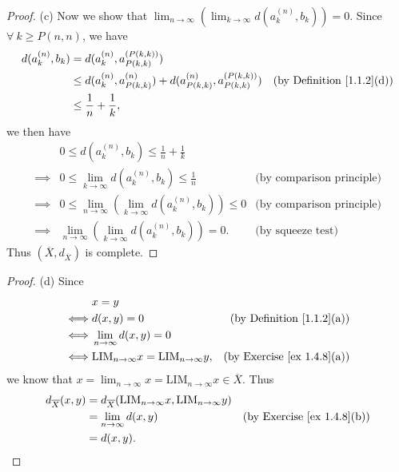 \begin{proof}{(c)}
    Now we show that \(\lim_{n \to \infty} (\lim_{k \to \infty} d(a_k^{(n)}, b_k)) = 0\).
    Since \(\forall\ k \geq P(n, n)\), we have
    \begin{align*}
        d(a_k^{(n)}, b_k) & = d(a_k^{(n)}, a_{P(k, k)}^{(P(k, k))})                                                                                      \\
                          & \leq d(a_k^{(n)}, a_{P(k, k)}^{(n)}) + d(a_{P(k, k)}^{(n)}, a_{P(k, k)}^{(P(k, k))}) & \text{(by Definition \ref{1.1.2}(d))} \\
                          & \leq \frac{1}{n} + \frac{1}{k},
    \end{align*}
    we then have
    \begin{align*}
                 & 0 \leq d(a_k^{(n)}, b_k) \leq \frac{1}{n} + \frac{1}{k}                                                      \\
        \implies & 0 \leq \lim_{k \to \infty} d(a_k^{(n)}, b_k) \leq \frac{1}{n}             & \text{(by comparison principle)} \\
        \implies & 0 \leq \lim_{n \to \infty} (\lim_{k \to \infty} d(a_k^{(n)}, b_k)) \leq 0 & \text{(by comparison principle)} \\
        \implies & \lim_{n \to \infty} (\lim_{k \to \infty} d(a_k^{(n)}, b_k)) = 0.          & \text{(by squeeze test)}
    \end{align*}
    Thus \((\overline{X}, d_{\overline{X}})\) is complete.
\end{proof}

\begin{proof}{(d)}
    Since
    \begin{align*}
             & x = y                                                                                               \\
        \iff & d(x, y) = 0                                                & \text{(by Definition \ref{1.1.2}(a))}  \\
        \iff & \lim_{n \to \infty} d(x, y) = 0                                                                     \\
        \iff & \text{LIM}_{n \to \infty} x = \text{LIM}_{n \to \infty} y, & \text{(by Exercise \ref{ex 1.4.8}(a))}
    \end{align*}
    we know that \(x = \lim_{n \to \infty} x = \text{LIM}_{n \to \infty} x \in \overline{X}\).
    Thus
    \begin{align*}
        d_{\overline{X}}(x, y) & = d_{\overline{X}}(\text{LIM}_{n \to \infty} x, \text{LIM}_{n \to \infty} y)                                          \\
                               & = \lim_{n \to \infty} d(x, y)                                                & \text{(by Exercise \ref{ex 1.4.8}(b))} \\
                               & = d(x, y).
    \end{align*}
\end{proof}